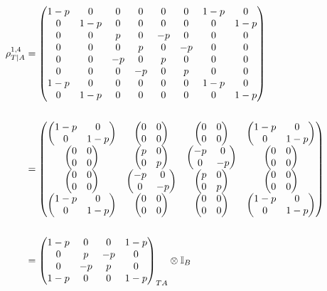 \documentclass[12pt]{article}
\begin{document}
\begin{align*}
    \rho_{T|A}^{1,4} &= \mqty(
    1-p & 0 & 0 & 0 & 0 & 0 & 1-p & 0 \\
    0 & 1-p & 0 & 0 & 0 & 0 & 0 & 1-p \\
    0 & 0 & p & 0 & -p & 0 & 0 & 0 \\
    0 & 0 & 0 & p & 0 & -p & 0 & 0 \\
    0 & 0 & -p & 0 & p & 0 & 0 & 0 \\
    0 & 0 & 0 & -p & 0 & p & 0 & 0 \\
    1-p & 0 & 0 & 0 & 0 & 0 & 1-p & 0 \\
    0 & 1-p & 0 & 0 & 0 & 0 & 0 & 1-p
) \\
\\
&= \mqty(
    \mqty(1-p & 0 \\ 0 & 1-p) & \mqty(0&0\\0&0) & \mqty(0&0\\0&0) & \mqty(1-p & 0 \\ 0 & 1-p) \\
    \mqty(0&0\\0&0) & \mqty(p&0\\0&p) & \mqty(-p&0\\0&-p) & \mqty(0&0\\0&0) \\
    \mqty(0&0\\0&0) & \mqty(-p&0\\0&-p) & \mqty(p&0\\0&p) & \mqty(0&0\\0&0) \\
    \mqty(1-p & 0 \\ 0 & 1-p) & \mqty(0&0\\0&0) & \mqty(0&0\\0&0) & \mqty(1-p & 0 \\ 0 & 1-p) 
) \\
\\
&= \mqty(1-p&0&0&1-p\\0&p&-p&0\\0&-p&p&0\\1-p&0&0&1-p)_{TA} \otimes \mathbb{I}_B
\end{align*}
\end{document}

